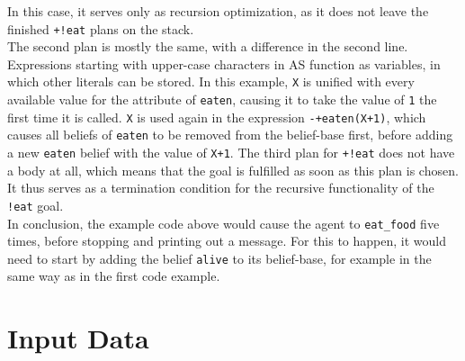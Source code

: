\documentclass[draft,final]{vutinfth} %
\begin{document}
In this case, it serves only as recursion optimization, as it does not leave the finished \verb|+!eat| plans on the stack. \\
The second plan is mostly the same, with a difference in the second line. 
Expressions starting with upper-case characters in AS function as variables, in which other literals can be stored. 
In this example, \verb|X| is unified with every available value for the attribute of \verb|eaten|, causing it to take the value of \verb|1| the first time it is called. 
\verb|X| is used again in the expression \verb|-+eaten(X+1)|, which causes all beliefs of \verb|eaten| to be removed from the belief-base first, before adding a new \verb|eaten| belief with the value of \verb|X+1|. 
The third plan for \verb|+!eat| does not have a body at all, which means that the goal is fulfilled as soon as this plan is chosen. 
It thus serves as a termination condition for the recursive functionality of the \verb|!eat| goal. \\
In conclusion, the example code above would cause the agent to \verb|eat_food| five times, before stopping and printing out a message. 
For this to happen, it would need to start by adding the belief \verb|alive| to its belief-base, for example in the same way as in the first code example.


\section{Input Data}
\label{chap:inputdata}
\end{document}
